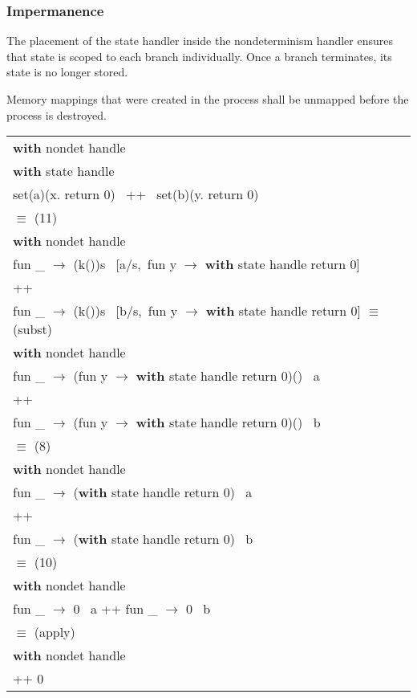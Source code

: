 \documentclass[logo,bsc,singlespacing,parskip]{infthesis}
\begin{document}
\subsubsection{Impermanence} 
The placement of the state handler inside the nondeterminism handler ensures that state is scoped to each branch individually. Once a branch terminates, its state is no longer stored.




\begin{tcolorbox}[colback=gray!10, colframe=gray!60, sharp corners, boxrule=0.5pt, title={POSIX Base Specifications, Issue 7, p.554}]
Memory mappings that were created in the process shall be unmapped before the process
 is destroyed.
 \end{tcolorbox}
 

\begin{longtable}{@{}l@{}}
\textbf{with } nondet handle \\
\quad \textbf{with } state handle \\
\quad\quad set(a)(x. return 0) \, ++ \, set(b)(y. return 0) \\

\quad$\equiv$ (11) \\

\textbf{with } nondet handle \\
\quad fun \_ $\rightarrow$ (k())s \ [a/s,\ fun y $\rightarrow$ \textbf{with } state handle return 0]\\
\quad\quad ++ \\
\quad fun \_ $\rightarrow$ (k())s \ [b/s,\ fun y $\rightarrow$ \textbf{with } state handle return 0] 
\quad$\equiv$ (subst) \\
\textbf{with } nondet handle \\
\quad fun \_ $\rightarrow$ (fun y $\rightarrow$ \textbf{with } state handle return 0)() \ a \\
\quad\quad ++ \\
\quad fun \_ $\rightarrow$ (fun y $\rightarrow$ \textbf{with } state handle return 0)() \ b \\
\quad$\equiv$ (8) \\
\textbf{with } nondet handle \\
\quad fun \_ $\rightarrow$ (\textbf{with } state handle return 0) \ a \\
\quad ++ \\
\quad fun \_ $\rightarrow$ (\textbf{with } state handle return 0) \ b \\
\quad$\equiv$ (10) \\
\textbf{with } nondet handle \\
\quad fun \_ $\rightarrow$ 0 \ a \quad ++ \quad fun \_ $\rightarrow$ 0 \ b \\
\quad$\equiv$ (apply) \\
\textbf{with } nondet handle \\
\quad 0 ++ 0 \\
\end{longtable}
\end{document}
